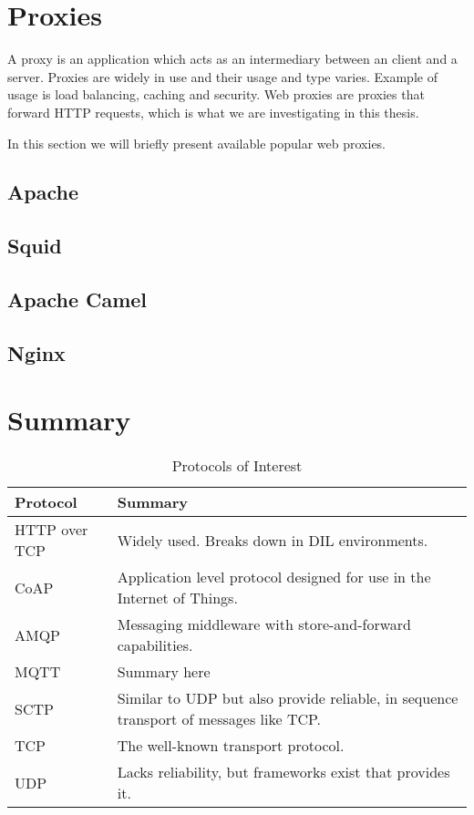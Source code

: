\section{Proxies}

A proxy is an application which acts as an intermediary between an client and a
server. Proxies are widely in use and their usage and type varies. Example of
usage is load balancing, caching and security. Web proxies are proxies that
forward HTTP requests, which is what we are investigating in this thesis.

In this section we will briefly present available popular web proxies.

\subsection{Apache}

\subsection{Squid}

\subsection{Apache Camel}

\subsection{Nginx}


\section{Summary}


\begin{table}[h]
\begin{tabularx}{\textwidth}{| X | X |}
\hline
  \textbf{Protocol} & \textbf{Summary} \\ \hline
  HTTP over TCP & Widely used. Breaks down in DIL environments.\\ \hline
  CoAP & Application level protocol designed for use in the Internet of Things. \\ \hline
  AMQP & Messaging middleware with store-and-forward capabilities.\\ \hline
  MQTT & Summary here\\ \hline
  SCTP & Similar to UDP but also provide reliable, in sequence transport of messages like TCP. \\ \hline
  TCP & The well-known transport protocol. \\ \hline
  UDP & Lacks reliability, but frameworks exist that provides it. \\ \hline
\end{tabularx}
\caption{Protocols of Interest}
\end{table}
